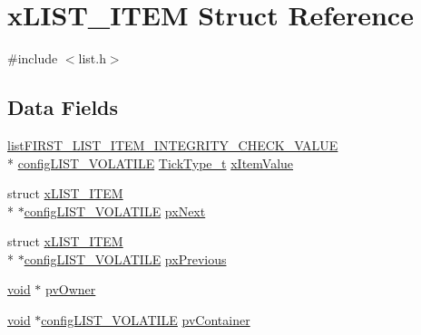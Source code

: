 \hypertarget{structxLIST__ITEM}{\section{x\-L\-I\-S\-T\-\_\-\-I\-T\-E\-M Struct Reference}
\label{structxLIST__ITEM}
}


{\ttfamily \#include $<$list.\-h$>$}

\subsection*{Data Fields}
\begin{DoxyCompactItemize}
\item 
\hyperlink{list_8h_a3611bd5d5d87cb26ac1dc7a4852b94a0}{list\-F\-I\-R\-S\-T\-\_\-\-L\-I\-S\-T\-\_\-\-I\-T\-E\-M\-\_\-\-I\-N\-T\-E\-G\-R\-I\-T\-Y\-\_\-\-C\-H\-E\-C\-K\-\_\-\-V\-A\-L\-U\-E} \\*
\hyperlink{list_8h_a2d5de557c5561c8980d1bf51d87d8cba}{config\-L\-I\-S\-T\-\_\-\-V\-O\-L\-A\-T\-I\-L\-E} \hyperlink{Flsh186_2prtmacro_8h_aa69c48c6e902ce54f70886e6573c92a9}{Tick\-Type\-\_\-t} \hyperlink{structxLIST__ITEM_a9b1f26de79f9da1403ca3ebc7a2e653a}{x\-Item\-Value}
\item 
struct \hyperlink{structxLIST__ITEM}{x\-L\-I\-S\-T\-\_\-\-I\-T\-E\-M} \\*
$\ast$\hyperlink{list_8h_a2d5de557c5561c8980d1bf51d87d8cba}{config\-L\-I\-S\-T\-\_\-\-V\-O\-L\-A\-T\-I\-L\-E} \hyperlink{structxLIST__ITEM_a03713c4ee953ef5ca6adbec883720c60}{px\-Next}
\item 
struct \hyperlink{structxLIST__ITEM}{x\-L\-I\-S\-T\-\_\-\-I\-T\-E\-M} \\*
$\ast$\hyperlink{list_8h_a2d5de557c5561c8980d1bf51d87d8cba}{config\-L\-I\-S\-T\-\_\-\-V\-O\-L\-A\-T\-I\-L\-E} \hyperlink{structxLIST__ITEM_ae8e553eae41010a8e41c66d76c94110b}{px\-Previous}
\item 
\hyperlink{Paradigm_2Tern__EE_2small_2portmacro_8h_a14d32f8130d3c0b212cfc751730b5b49}{void} $\ast$ \hyperlink{structxLIST__ITEM_aeb3110b50fe0dbce826d929b27b5ddb1}{pv\-Owner}
\item 
\hyperlink{Paradigm_2Tern__EE_2small_2portmacro_8h_a14d32f8130d3c0b212cfc751730b5b49}{void} $\ast$\hyperlink{list_8h_a2d5de557c5561c8980d1bf51d87d8cba}{config\-L\-I\-S\-T\-\_\-\-V\-O\-L\-A\-T\-I\-L\-E} \hyperlink{structxLIST__ITEM_a341462d06236aa07eaf1a864e4b59951}{pv\-Container}
\end{DoxyCompactItemize}


